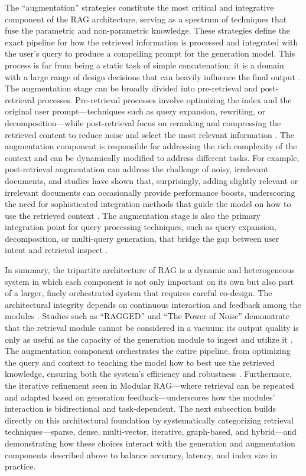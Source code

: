 \documentclass[11pt]{article}
\begin{document}
The ``augmentation'' strategies constitute the most critical and integrative component of the RAG architecture, serving as a spectrum of techniques that fuse the parametric and non-parametric knowledge. These strategies define the exact pipeline for how the retrieved information is processed and integrated with the user's query to produce a compelling prompt for the generation model. This process is far from being a static task of simple concatenation; it is a domain with a large range of design decisions that can heavily influence the final output \cite{ref1}. The augmentation stage can be broadly divided into pre-retrieval and post-retrieval processes. Pre-retrieval processes involve optimizing the index and the original user prompt---techniques such as query expansion, rewriting, or decomposition---while post-retrieval focus on reranking and compressing the retrieved content to reduce noise and select the most relevant information \cite{ref1}. The augmentation component is responsible for addressing the rich complexity of the context and can be dynamically modified to address different tasks. For example, post-retrieval augmentation can address the challenge of noisy, irrelevant documents, and studies have shown that, surprisingly, adding slightly relevant or irrelevant documents can occasionally provide performance boosts, underscoring the need for sophisticated integration methods that guide the model on how to use the retrieved context \cite{ref10}. The augmentation stage is also the primary integration point for query processing techniques, such as query expansion, decomposition, or multi-query generation, that bridge the gap between user intent and retrieval inspect \cite{ref1}.

In summary, the tripartite architecture of RAG is a dynamic and heterogeneous system in which each component is not only important on its own but also part of a larger, finely orchestrated system that requires careful co-design. The architectural integrity depends on continuous interaction and feedback among the modules \cite{ref1}. Studies such as ``RAGGED'' and ``The Power of Noise'' demonstrate that the retrieval module cannot be considered in a vacuum; its output quality is only as useful as the capacity of the generation module to ingest and utilize it \cite{ref7}. The augmentation component orchestrates the entire pipeline, from optimizing the query and context to teaching the model how to best use the retrieved knowledge, ensuring both the system's efficiency and robustness \cite{ref1}. Furthermore, the iterative refinement seen in Modular RAG---where retrieval can be repeated and adapted based on generation feedback---underscores how the modules' interaction is bidirectional and task-dependent. The next subsection builds directly on this architectural foundation by systematically categorizing retrieval techniques---sparse, dense, multi-vector, iterative, graph-based, and hybrid---and demonstrating how these choices interact with the generation and augmentation components described above to balance accuracy, latency, and index size in practice.
\end{document}
